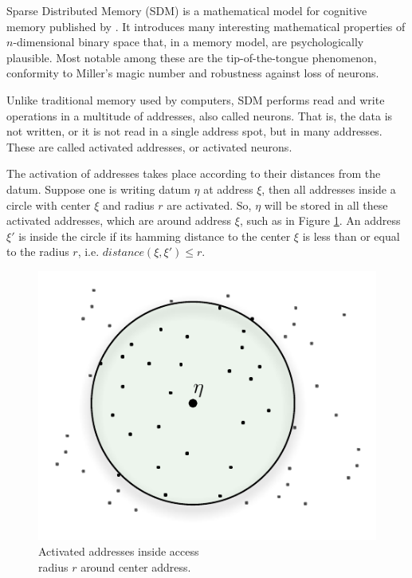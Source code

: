 
Sparse Distributed Memory (SDM) is a mathematical model for cognitive memory published by \citet{Kanerva1988}. It introduces many interesting mathematical properties of $n$-dimensional binary space that, in a memory model, are psychologically plausible.  Most notable among these are the tip-of-the-tongue phenomenon, conformity to Miller's magic number \citep{Linhares2011} and robustness against loss of neurons.

Unlike traditional memory used by computers, SDM performs read and write operations in a multitude of addresses, also called neurons.  That is, the data is not written, or it is not read in a single address spot, but in many addresses. These are called activated addresses, or activated neurons.

The activation of addresses takes place according to their distances from the datum. Suppose one is writing datum $\eta$ at address $\xi$, then all addresses inside a circle with center $\xi$ and radius $r$ are activated. So, $\eta$ will be stored in all these activated addresses, which are around address $\xi$, such as in Figure \ref{fig-addresses-inside-access-radius}.  An address $\xi'$ is inside the circle if its hamming distance to the center $\xi$ is less than or equal to the radius $r$, i.e. $distance(\xi,\xi')\leq r$.

\begin{figure}[h]
\centering\includegraphics[scale=0.75]{./images02/p_circle_r.pdf}

\caption{Activated addresses inside access \protect \\
radius $r$ around center address.\label{fig-addresses-inside-access-radius}}
\end{figure}


